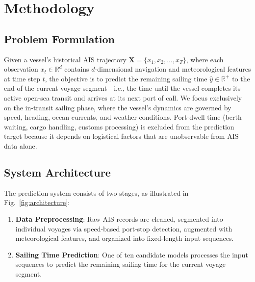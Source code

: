 \documentclass[conference]{IEEEtran}
\begin{document}
\section{Methodology}

\subsection{Problem Formulation}

Given a vessel's historical AIS trajectory $\mathbf{X} = \{x_1, x_2, \ldots, x_T\}$, where each observation $x_t \in \mathbb{R}^{d}$ contains $d$-dimensional navigation and meteorological features at time step $t$, the objective is to predict the remaining sailing time $\hat{y} \in \mathbb{R}^{+}$ to the end of the current voyage segment---i.e., the time until the vessel completes its active open-sea transit and arrives at its next port of call.
We focus exclusively on the in-transit sailing phase, where the vessel's dynamics are governed by speed, heading, ocean currents, and weather conditions. Port-dwell time (berth waiting, cargo handling, customs processing) is excluded from the prediction target because it depends on logistical factors that are unobservable from AIS data alone.

\subsection{System Architecture}

The prediction system consists of two stages, as illustrated in Fig.~\ref{fig:architecture}:

\begin{enumerate}
    \item \textbf{Data Preprocessing}: Raw AIS records are cleaned, segmented into individual voyages via speed-based port-stop detection, augmented with meteorological features, and organized into fixed-length input sequences.
    \item \textbf{Sailing Time Prediction}: One of ten candidate models processes the input sequences to predict the remaining sailing time for the current voyage segment.
\end{enumerate}
\end{document}
